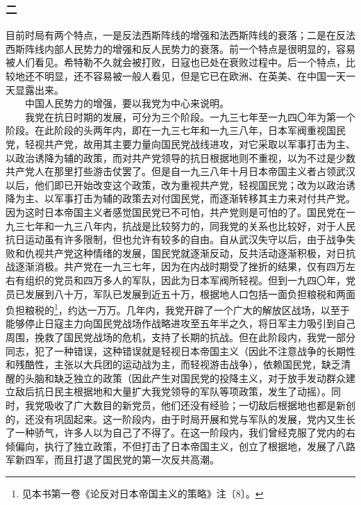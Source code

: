 \documentclass[cn,11pt,chinese]{elegantbook}
\def\myformat#1{\hfil\hfil #1}
\begin{document}
\subsubsection*{\myformat{二}}
目前时局有两个特点，一是反法西斯阵线的增强和法西斯阵线的衰落；二是在反法西斯阵线内部人民势力的增强和反人民势力的衰落。前一个特点是很明显的，容易被人们看见。希特勒不久就会被打败，日寇也已处在衰败过程中。后一个特点，比较地还不明显，还不容易被一般人看见，但是它已在欧洲、在英美、在中国一天一天显露出来。\\
　　中国人民势力的增强，要以我党为中心来说明。\\
　　我党在抗日时期的发展，可分为三个阶段。一九三七年至一九四〇年为第一个阶段。在此阶段的头两年内，即在一九三七年和一九三八年，日本军阀重视国民党，轻视共产党，故用其主要力量向国民党战线进攻，对它采取以军事打击为主、以政治诱降为辅的政策，而对共产党领导的抗日根据地则不重视，以为不过是少数共产党人在那里打些游击仗罢了。但是自一九三八年十月日本帝国主义者占领武汉以后，他们即已开始改变这个政策，改为重视共产党，轻视国民党；改为以政治诱降为主、以军事打击为辅的政策去对付国民党，而逐渐转移其主力来对付共产党。因为这时日本帝国主义者感觉国民党已不可怕，共产党则是可怕的了。国民党在一九三七年和一九三八年内，抗战是比较努力的，同我党的关系也比较好，对于人民抗日运动虽有许多限制，但也允许有较多的自由。自从武汉失守以后，由于战争失败和仇视共产党这种情绪的发展，国民党就逐渐反动，反共活动逐渐积极，对日抗战逐渐消极。共产党在一九三七年，因为在内战时期受了挫折的结果，仅有四万左右有组织的党员和四万多人的军队，因此为日本军阀所轻视。但到一九四〇年，党员已发展到八十万，军队已发展到近五十万，根据地人口包括一面负担粮税和两面负担粮税的\footnote[13]{ 见本书第一卷《论反对日本帝国主义的策略》注〔8〕。}，约达一万万。几年内，我党开辟了一个广大的解放区战场，以至于能够停止日寇主力向国民党战场作战略进攻至五年半之久，将日军主力吸引到自己周围，挽救了国民党战场的危机，支持了长期的抗战。但在此阶段内，我党一部分同志，犯了一种错误，这种错误就是轻视日本帝国主义（因此不注意战争的长期性和残酷性，主张以大兵团的运动战为主，而轻视游击战争），依赖国民党，缺乏清醒的头脑和缺乏独立的政策（因此产生对国民党的投降主义，对于放手发动群众建立敌后抗日民主根据地和大量扩大我党领导的军队等项政策，发生了动摇）。同时，我党吸收了广大数目的新党员，他们还没有经验；一切敌后根据地也都是新创的，还没有巩固起来。这一阶段内，由于时局开展和党与军队的发展，党内又生长了一种骄气，许多人以为自己了不得了。在这一阶段内，我们曾经克服了党内的右倾偏向，执行了独立政策，不但打击了日本帝国主义，创立了根据地，发展了八路军新四军，而且打退了国民党的第一次反共高潮。\\
\end{document}
